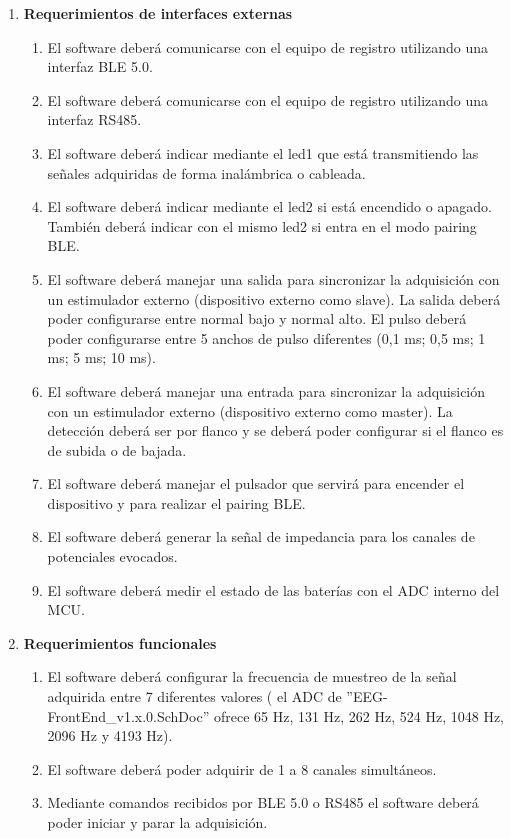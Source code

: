\documentclass[
11pt, %
codirector, %
]{charter}
\begin{document}
\begin{enumerate}
	\item \textbf{Requerimientos de interfaces externas}
		\begin{enumerate}
			\item El software deberá comunicarse con el equipo de registro utilizando una interfaz BLE 5.0.
			\item El software deberá comunicarse con el equipo de registro utilizando una interfaz RS485. 
			\item El software deberá indicar mediante el led1 que está transmitiendo las señales adquiridas de forma inalámbrica o cableada. 
			\item El software deberá indicar mediante el led2 si está encendido o apagado. También deberá indicar con el mismo led2 si entra en el modo pairing BLE.
			\item El software deberá manejar una salida para sincronizar la adquisición con un estimulador externo (dispositivo externo como slave). La salida deberá poder configurarse entre normal bajo y normal alto. El pulso deberá poder configurarse entre 5 anchos de pulso diferentes (0,1 ms; 0,5 ms; 1 ms; 5 ms; 10 ms). 
			\item El software deberá manejar una entrada para sincronizar la adquisición con un estimulador externo (dispositivo externo como master). La detección deberá ser por flanco y se deberá poder configurar si el flanco es de subida o de bajada.
			\item El software deberá manejar el pulsador que servirá para encender el dispositivo y para realizar el pairing BLE.
			\item El software deberá generar la señal de impedancia para los canales de potenciales evocados.
			\item El software deberá medir el estado de las baterías con el ADC interno del MCU.
		\end{enumerate}
	\item \textbf{Requerimientos funcionales}
		\begin{enumerate}
			\item El software deberá configurar la frecuencia de muestreo de la señal adquirida entre 7 diferentes valores ( el ADC de ''EEG-FrontEnd\_v1.x.0.SchDoc” ofrece 65 Hz, 131 Hz, 262 Hz, 524 Hz, 1048 Hz, 2096 Hz y 4193 Hz).
			\item El software deberá poder adquirir de 1 a 8 canales simultáneos.
			\item Mediante comandos recibidos por BLE 5.0 o RS485 el software deberá poder iniciar y parar la adquisición.

\end{enumerate}
\end{enumerate}
\end{document}
